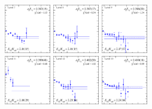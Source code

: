 \begin{figure}[H]
    \includegraphics[width=0.18\textwidth]{figures/sigmas/g2g/fits/fit_8.pdf}
    \includegraphics[width=0.18\textwidth]{figures/sigmas/g2g/fits/fit_5.pdf}
    \includegraphics[width=0.18\textwidth]{figures/sigmas/g2g/fits/fit_7.pdf}\\
    \includegraphics[width=0.18\textwidth]{figures/sigmas/g2g/fits/fit_31.pdf}
    \includegraphics[width=0.18\textwidth]{figures/sigmas/g2g/fits/fit_21.pdf}
    \includegraphics[width=0.18\textwidth]{figures/sigmas/g2g/fits/fit_12.pdf}

\end{figure}
